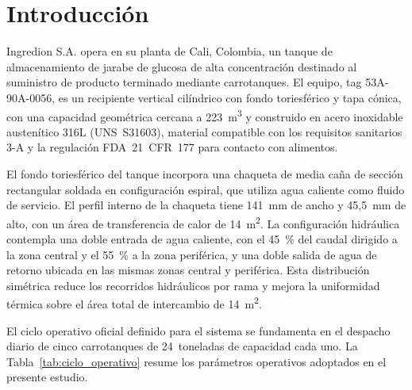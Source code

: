 \section{Introducci\'on}

Ingredion S.A. opera en su planta de Cali, Colombia, un tanque de almacenamiento de jarabe de glucosa de alta concentraci\'on destinado al suministro de producto terminado mediante carrotanques. El equipo, tag 53A-90A-0056, es un recipiente vertical cil\'indrico con fondo toriesf\'erico y tapa c\'onica, con una capacidad geom\'etrica cercana a 223~m\textsuperscript{3} y construido en acero inoxidable austen\'itico 316L (UNS~S31603), material compatible con los requisitos sanitarios 3-A y la regulaci\'on FDA~21~CFR~177 para contacto con alimentos.

El fondo toriesf\'erico del tanque incorpora una chaqueta de media ca\~na de secci\'on rectangular soldada en configuraci\'on espiral, que utiliza agua caliente como fluido de servicio. El perfil interno de la chaqueta tiene 141~mm de ancho y 45,5~mm de alto, con un \'area de transferencia de calor de 14~m\textsuperscript{2}. La configuraci\'on hidr\'aulica contempla una doble entrada de agua caliente, con el 45~\% del caudal dirigido a la zona central y el 55~\% a la zona perif\'erica, y una doble salida de agua de retorno ubicada en las mismas zonas central y perif\'erica. Esta distribuci\'on sim\'etrica reduce los recorridos hidr\'aulicos por rama y mejora la uniformidad t\'ermica sobre el \'area total de intercambio de 14~m\textsuperscript{2}.

El ciclo operativo oficial definido para el sistema se fundamenta en el despacho diario de cinco carrotanques de 24~toneladas de capacidad cada uno. La Tabla~\ref{tab:ciclo_operativo} resume los par\'ametros operativos adoptados en el presente estudio.

